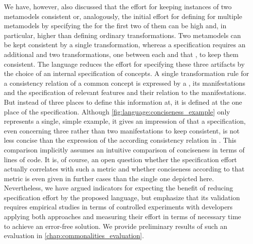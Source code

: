 We have, however, also discussed that the effort for keeping instances of two metamodels consistent or, analogously, the initial effort for defining \commonalities for multiple metamodels by specifying the \commonalities for the first two of them can be high and, in particular, higher than defining ordinary transformations.
Two metamodels can be kept consistent by a single transformation, whereas a \commonalities specification requires an additional \conceptmetamodel and two transformations, one between each \concretemetamodel and that \conceptmetamodels, to keep them consistent.
The \commonalities language reduces the effort for specifying these three artifacts by the choice of an internal specification of concepts.
A single transformation rule for a consistency relation of a common concept is expressed by a \commonality, its manifestations and the specification of relevant features and their relation to the manifestations.
But instead of three places to define this information at, it is defined at the one place of the \commonality specification.
Although \autoref{fig:language:conciseness_example} only represents a single, simple example, it gives an impression of that a \commonalities specification, even concerning three rather than two manifestations to keep consistent, is not less concise than the expression of the according consistency relation in \qvtr.
This comparison implicitly assumes an intuitive comparison of conciseness in terms of lines of code.
It is, of course, an open question whether the specification effort actually correlates with such a metric and whether conciseness according to that metric is even given in further cases than the single one depicted here.
Nevertheless, we have argued indicators for expecting the benefit of reducing specification effort by the proposed language, but emphasize that its validation requires empirical studies in terms of controlled experiments with developers applying both approaches and measuring their effort in terms of necessary time to achieve an error-free solution.
We provide preliminary results of such an evaluation in \autoref{chap:commonalities_evaluation}.



